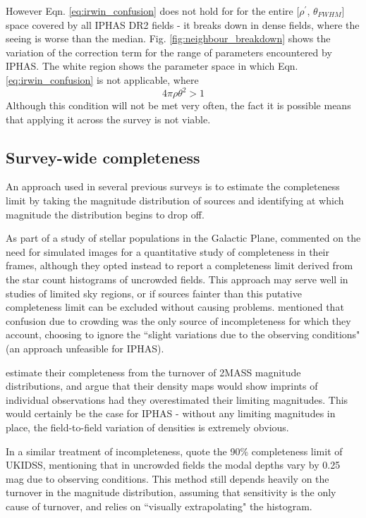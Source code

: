 \documentclass[a4paper,useAMS,usenatbib]{mn2e}
\begin{document}
However Eqn. \ref{eq:irwin_confusion} does not hold for for the entire
[$\rho^{\prime}$, $\theta_{FWHM}$] space covered by all IPHAS DR2 fields - it
breaks down in dense fields, where the seeing is worse than the median. Fig.
\ref{fig:neighbour_breakdown} shows the variation of the correction term for the range of parameters encountered by IPHAS. The white region shows the parameter space in which Eqn. \ref{eq:irwin_confusion} is not applicable, where
\begin{equation}
4\pi\rho\theta^{2} > 1
\label{eq:neighbour_breakdown}
\end{equation}
Although this condition will not be met very often, the fact it is possible means that applying it across the survey is not viable. 

\subsection{Survey-wide completeness}
\label{subsec:turnovers} 

An approach used in several previous
surveys \citep{Ruphy1997, Cambresy2002, Lucas2008} is to estimate the
completeness limit by taking the magnitude distribution of sources and
identifying at which magnitude the distribution begins to drop off.

As part of a study of stellar populations in the Galactic Plane,
\citet{Ruphy1997} commented on the need for simulated images for a quantitative
study of completeness in their frames, although they opted instead to report a
completeness limit derived from the star count histograms of uncrowded fields.
This approach may serve well in studies of limited sky regions, or if sources
fainter than this putative completeness limit can be excluded without causing
problems. \citet{Ruphy1997} mentioned that confusion due to crowding was the
only source of incompleteness for which they account, choosing to ignore the
``slight variations due to the observing conditions" (an approach unfeasible for
IPHAS).

\citet{Cambresy2002} estimate their completeness from the turnover of 2MASS
magnitude distributions, and argue that their density maps would show imprints
of individual observations had they overestimated their limiting magnitudes.
This would certainly be the case for IPHAS - without any limiting magnitudes in
place, the field-to-field variation of densities is extremely obvious.

In a similar treatment of incompleteness, \citet{Lucas2008} quote the 90\%
completeness limit of UKIDSS, mentioning that in uncrowded fields the modal
depths vary by 0.25 mag due to observing conditions. This method still depends
heavily on the turnover in the magnitude distribution, assuming that sensitivity is the only cause of turnover, and relies on ``visually extrapolating" the histogram.
\end{document}
